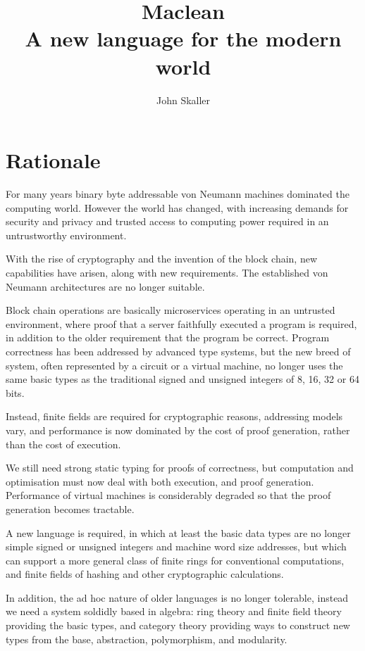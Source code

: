 \documentclass[oneside]{book}
\title{Maclean\\ A new language for the modern world}
\author{John Skaller}
\theoremstyle{plain}
\theoremstyle{definition}
\theoremstyle{plain}
\begin{document}
\maketitle
\tableofcontents
\chapter{Rationale}
For many years binary byte addressable von Neumann machines dominated the computing world.
However the world has changed, with increasing demands for security and privacy and
trusted access to computing power required in an untrustworthy environment.

With the rise of cryptography and the invention of the block chain, new capabilities
have arisen, along with new requirements. The established von Neumann architectures
are no longer suitable.

Block chain operations are basically microservices operating in an untrusted environment,
where proof that a server faithfully executed a program is required, in addition to the
older requirement that the program be correct. Program correctness has been addressed
by advanced type systems, but the new breed of system, often represented by a circuit
or a virtual machine, no longer uses the same basic types as the traditional signed
and unsigned integers of 8, 16, 32 or 64 bits.

Instead, finite fields are required for cryptographic reasons, addressing models vary,
and performance is now dominated by the cost of proof generation, rather than the
cost of execution.

We still need strong static typing for proofs of correctness, but computation and
optimisation must now deal with both execution, and proof generation. Performance
of virtual machines is considerably degraded so that the proof generation becomes
tractable.

A new language is required, in which at least the basic data types are no longer
simple signed or unsigned integers and machine word size addresses, but which
can support a more general class of finite rings for conventional computations,
and finite fields of hashing and other cryptographic calculations.

In addition, the ad hoc nature of older languages is no longer tolerable,
instead we need a system soldidly based in algebra: ring theory and finite field
theory providing the basic types, and category theory providing ways to
construct new types from the base, abstraction, polymorphism, and modularity.
\end{document}
